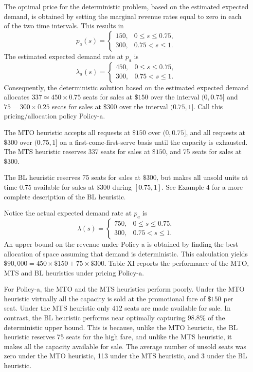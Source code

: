 The optimal price for the deterministic problem, based on the estimated expected demand, is obtained by setting the marginal revenue rates equal to zero in each of the two time intervals. This results in
\[
p_a(s) = \left\{ \begin{array}{ll} 
150, & 0 \leqslant s \leqslant 0.75, \\
300, & 0.75 < s \leqslant 1. 
\end{array} \right.
\]
The estimated expected demand rate at \(p_a\) is
\[
\lambda_a(s) = \left\{ \begin{array}{ll} 
450, & 0 \leqslant s \leqslant 0.75, \\
300, & 0.75 < s \leqslant 1. 
\end{array} \right.
\]
Consequently, the deterministic solution based on the estimated expected demand allocates \(337 \simeq 450 \times 0.75\) seats for sales at \(\$150\) over the interval \((0, 0.75]\) and \(75 = 300 \times 0.25\) seats for sales at \(\$300\) over the interval \((0.75, 1]\). Call this pricing/allocation policy Policy-a.

The MTO heuristic accepts all requests at \(\$150\) over \((0, 0.75]\), and all requests at \(\$300\) over \((0.75, 1]\) on a first-come-first-serve basis until the capacity is exhausted. The MTS heuristic reserves 337 seats for sales at \(\$150\), and 75 seats for sales at \(\$300\).

The BL heuristic reserves 75 seats for sales at \(\$300\), but makes all unsold units at time 0.75 available for sales at \(\$300\) during \([0.75, 1]\). See Example 4 for a more complete description of the BL heuristic.

Notice the actual expected demand rate at \(p_a\) is
\[
\lambda(s) = \left\{ \begin{array}{ll} 
750, & 0 \leqslant s \leqslant 0.75, \\
300, & 0.75 < s \leqslant 1. 
\end{array} \right.
\]
An upper bound on the revenue under Policy-a is obtained by finding the best allocation of space assuming that demand is deterministic. This calculation yields \(\$90,000 = 450 \times \$150 + 75 \times \$300\). Table XI reports the performance of the MTO, MTS and BL heuristics under pricing Policy-a.

For Policy-a, the MTO and the MTS heuristics perform poorly. Under the MTO heuristic virtually all the capacity is sold at the promotional fare of \(\$150\) per seat. Under the MTS heuristic only 412 seats are made available for sale. In contrast, the BL heuristic performs near optimally capturing \(98.8\%\) of the deterministic upper bound. This is because, unlike the MTO heuristic, the BL heuristic reserves 75 seats for the high fare, and unlike the MTS heuristic, it makes all the capacity available for sale. The average number of unsold seats was zero under the MTO heuristic, 113 under the MTS heuristic, and 3 under the BL heuristic.

